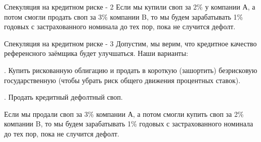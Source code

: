 \documentclass{beamer}
\begin{document}
\begin{frame}{Спекуляция на кредитном риске - 2}
\justify
Если мы купили своп за 2\% у компании А, а потом смогли продать своп за 3\% компании B, то мы будем зарабатывать 1\% годовых с застрахованного номинала до тех пор, пока не случится дефолт.

\justify
\centering
{}
\end{frame}



\begin{frame}{Спекуляция на кредитном риске - 3}
\justify
Допустим, мы верим, что кредитное качество референсного заёмщика будет улучшаться. Наши варианты:

. Купить рискованную облигацию и продать в короткую (зашортить) безрисковую государственную (чтобы убрать риск общего движения процентных ставок).

. Продать кредитный дефолтный своп.

\justify
Если мы продали своп за 3\% компании А, а потом смогли купить своп за 2\% компании B, то мы будем зарабатывать 1\% годовых с застрахованного номинала до тех пор, пока не случится дефолт.
\end{frame}
\end{document}
